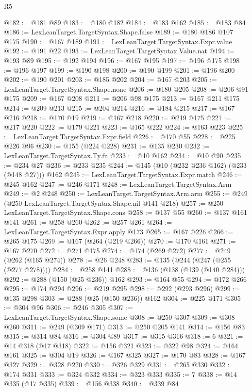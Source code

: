\begin{lexlean}{R5}
\begin{coremodule}
@182 := @181 @89
@183 := @180 @182
@184 := @183 @162
@185 := @183 @84
@186 := LexLeanTarget.TargetSyntax.Shape.false
@189 := @180 @186 @107 @175
@190 := @167 @189
@191 := LexLeanTarget.TargetSyntax.Expr.value
@192 := @191 @22
@193 := LexLeanTarget.TargetSyntax.Value.nat
@194 := @193 @89
@195 := @192 @194
@196 := @167 @195
@197 := @196 @175
@198 := @196 @197
@199 := @190 @198
@200 := @190 @199
@201 := @196 @200
@202 := @190 @201
@203 := @185 @202
@204 := @167 @203
@205 := LexLeanTarget.TargetSyntax.Shape.none
@206 := @180 @205
@208 := @206 @91 @175
@209 := @167 @208
@211 := @206 @98 @175
@213 := @167 @211 @175
@214 := @209 @213
@215 := @204 @214
@216 := @184 @215
@217 := @167 @216
@218 := @170 @19
@219 := @167 @218
@220 := @219 @175
@221 := @217 @220
@222 := @179 @221
@223 := @165 @222
@224 := @163 @223
@225 := LexLeanTarget.TargetSyntax.Expr.field
@226 := @170 @55
@228 := @225 @226 @96
@230 := @155 (@224 @228)
@231 := @135 @230
@232 := LexLeanTarget.TargetSyntax.Ty.fn
@233 := @10 @162
@234 := @10 @90
@235 := @234 @27
@236 := @233 @235
@244 := @145 (@10 (@232 @236 @162) (@233 (@148 @27))) @162
@245 := LexLeanTarget.TargetSyntax.Expr.match
@246 := @245 @162
@247 := @246 @171
@248 := LexLeanTarget.TargetSyntax.Arm
@249 := @2 @248
@250 := LexLeanTarget.TargetSyntax.Arm.arm
@255 := @249 (@250 LexLeanTarget.TargetSyntax.Shape.nil @141 @218)
@257 := @250 LexLeanTarget.TargetSyntax.Shape.cons
@258 := @137 @55
@260 := @137 @161 @141
@261 := @258 @260
@262 := @257 @261
@264 := LexLeanTarget.TargetSyntax.Expr.apply @173
@265 := @167 @226
@266 := @265 @175
@269 := @167 (@264 (@219 @266))
@270 := @170 @161
@271 := @167 @270
@272 := @271 @175
@274 := @174 (@269 @272)
@277 := @249 (@262 (@165 @274))
@278 := @26 @248
@283 := @135 (@244 (@247 (@255 (@277 @278))))
@284 := @258 @141
@288 := @136 (@138 (@139 (@140 @284)))
@292 := @288 (@150 (@25 @236)) @162
@293 := @164 @55
@294 := @172 @266
@295 := @174 @294
@296 := @219 @295
@298 := @292 (@293 @296)
@299 := @135 @298
@303 := @288 (@25 (@150 @236)) @162
@304 := @225 @171
@305 := @304 @96
@306 := @246 @305
@307 := LexLeanTarget.TargetSyntax.Shape.some
@308 := @250 @307
@309 := @308 @260
@311 := @249 (@309 @171)
@313 := @250 @205 @141
@314 := @156 @83
@315 := @314 @84
@316 := @304 @89
@317 := @315 @316
@318 := 6
@321 := @14 @318 (@17 @318)
@322 := @156 @321
@323 := @322 @98
@324 := @164 @161
@325 := @304 @19
@326 := @167 @325
@327 := @170 @83
@328 := @167 @327
@329 := @328 @220
@330 := @326 @329
@331 := @265 @330
@332 := @174 @331
@333 := @324 @332
@334 := @323 @333
@335 := 7
@338 := @14 @335 (@17 @335)
@339 := @156 @338
@340 := @339 @84

\end{coremodule}
\end{lexlean}
